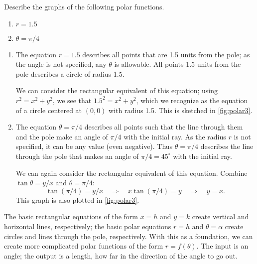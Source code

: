 \begin{example}\label{ex_polar3}
Describe the graphs of the following polar functions.
\begin{enumerate}
	\item $r = 1.5$
	\item $\theta = \pi/4 $
\end{enumerate}
%
\solution
\begin{enumerate}
\item		The equation $r=1.5$ describes all points that are 1.5 units from the pole; as the angle is not specified, any $\theta$ is allowable. All points 1.5 units from the pole describes a circle of radius 1.5.

We can consider the rectangular equivalent of this equation; using $r^2=x^2+y^2$, we see that $1.5^2=x^2+y^2$, which we recognize as the equation of a circle centered at $(0,0)$ with radius 1.5. This is sketched in \autoref{fig:polar3}.


\item		The equation $\theta = \pi/4$ describes all points such that the line through them and the pole make an angle of $\pi/4$ with the initial ray. As the radius $r$ is not specified, it can be any value (even negative). Thus $\theta = \pi/4$ describes the line through the pole that makes an angle of $\pi/4 = 45^\circ$ with the initial ray.

We can again consider the rectangular equivalent of this equation. Combine $\tan \theta =y/x$ and $\theta =\pi/4$:
\[\tan(\pi/4) = y/x \quad \Rightarrow \quad x\tan(\pi/4) = y \quad \Rightarrow \quad y = x.\] 
This graph is also plotted in \autoref{fig:polar3}.
\end{enumerate}
\end{example}

The basic rectangular equations of the form $x=h$ and $y=k$ create vertical and horizontal lines, respectively; the basic polar equations $r= h$ and $\theta =\alpha$ create circles and lines through the pole, respectively. With this as a foundation, we can create more complicated polar functions of the form $r=f(\theta)$. The input is an angle; the output is a length, how far in the direction of the angle to go out.

